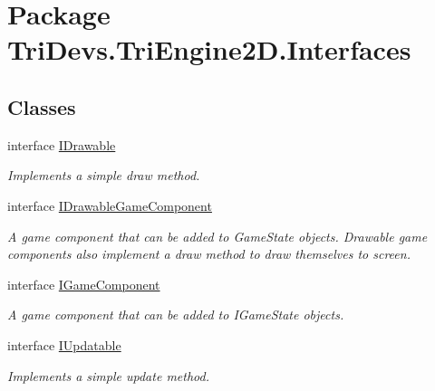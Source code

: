 \hypertarget{namespace_tri_devs_1_1_tri_engine2_d_1_1_interfaces}{\section{Package Tri\-Devs.\-Tri\-Engine2\-D.\-Interfaces}
\label{namespace_tri_devs_1_1_tri_engine2_d_1_1_interfaces}
}
\subsection*{Classes}
\begin{DoxyCompactItemize}
\item 
interface \hyperlink{interface_tri_devs_1_1_tri_engine2_d_1_1_interfaces_1_1_i_drawable}{I\-Drawable}
\begin{DoxyCompactList}\small\item\em Implements a simple draw method. \end{DoxyCompactList}\item 
interface \hyperlink{interface_tri_devs_1_1_tri_engine2_d_1_1_interfaces_1_1_i_drawable_game_component}{I\-Drawable\-Game\-Component}
\begin{DoxyCompactList}\small\item\em A game component that can be added to Game\-State objects. Drawable game components also implement a draw method to draw themselves to screen. \end{DoxyCompactList}\item 
interface \hyperlink{interface_tri_devs_1_1_tri_engine2_d_1_1_interfaces_1_1_i_game_component}{I\-Game\-Component}
\begin{DoxyCompactList}\small\item\em A game component that can be added to I\-Game\-State objects. \end{DoxyCompactList}\item 
interface \hyperlink{interface_tri_devs_1_1_tri_engine2_d_1_1_interfaces_1_1_i_updatable}{I\-Updatable}
\begin{DoxyCompactList}\small\item\em Implements a simple update method. \end{DoxyCompactList}\end{DoxyCompactItemize}
